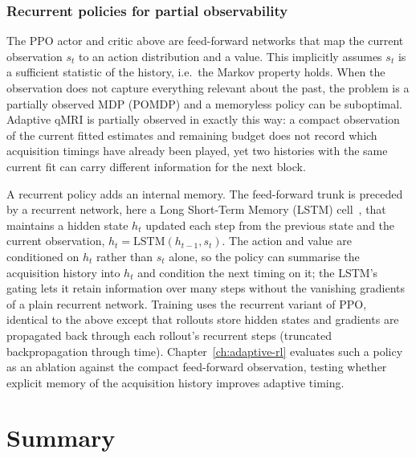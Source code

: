 \subsubsection{Recurrent policies for partial observability}
The PPO actor and critic above are feed-forward networks that map the current
observation $s_t$ to an action distribution and a value. This implicitly
assumes $s_t$ is a sufficient statistic of the history, i.e.\ the Markov
property holds. When the observation does not capture everything relevant about
the past, the problem is a partially observed MDP (POMDP) and a memoryless
policy can be suboptimal. Adaptive qMRI is partially observed in exactly this
way: a compact observation of the current fitted estimates and remaining budget
does not record which acquisition timings have already been played, yet two
histories with the same current fit can carry different information for the next
block.

A recurrent policy adds an internal memory. The feed-forward trunk is preceded
by a recurrent network, here a Long Short-Term Memory (LSTM)
cell~\cite{hochreiter_lstm_1997}, that maintains a hidden state $h_t$ updated
each step from the previous state and the current observation,
$h_t = \mathrm{LSTM}(h_{t-1}, s_t)$. The action and value are conditioned on
$h_t$ rather than $s_t$ alone, so the policy can summarise the acquisition
history into $h_t$ and condition the next timing on it; the LSTM's gating lets
it retain information over many steps without the vanishing gradients of a
plain recurrent network. Training uses the recurrent variant of PPO, identical
to the above except that rollouts store hidden states and gradients are
propagated back through each rollout's recurrent steps (truncated
backpropagation through time). Chapter~\ref{ch:adaptive-rl} evaluates such a
policy as an ablation against the compact feed-forward observation, testing
whether explicit memory of the acquisition history improves adaptive timing.

\section{Summary}
\label{sec:bg-summary}

